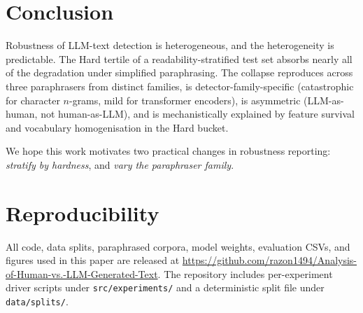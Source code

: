 \documentclass[11pt,a4paper]{article}
\begin{document}
\section{Conclusion}

Robustness of LLM-text detection is heterogeneous, and the heterogeneity is
predictable. The Hard tertile of a readability-stratified test set
absorbs nearly all of the degradation under simplified paraphrasing.
The collapse reproduces across three paraphrasers from distinct families,
is detector-family-specific (catastrophic for character $n$-grams, mild for
transformer encoders), is asymmetric (LLM-as-human, not human-as-LLM),
and is mechanistically explained by feature survival and vocabulary
homogenisation in the Hard bucket.

We hope this work motivates two practical changes in robustness reporting:
\emph{stratify by hardness}, and \emph{vary the paraphraser family}.

\section*{Reproducibility}
All code, data splits, paraphrased corpora, model weights, evaluation CSVs,
and figures used in this paper are released at
\url{https://github.com/razon1494/Analysis-of-Human-vs.-LLM-Generated-Text}.
The repository includes per-experiment driver scripts under
\texttt{src/experiments/} and a deterministic split file under
\texttt{data/splits/}.
\end{document}
